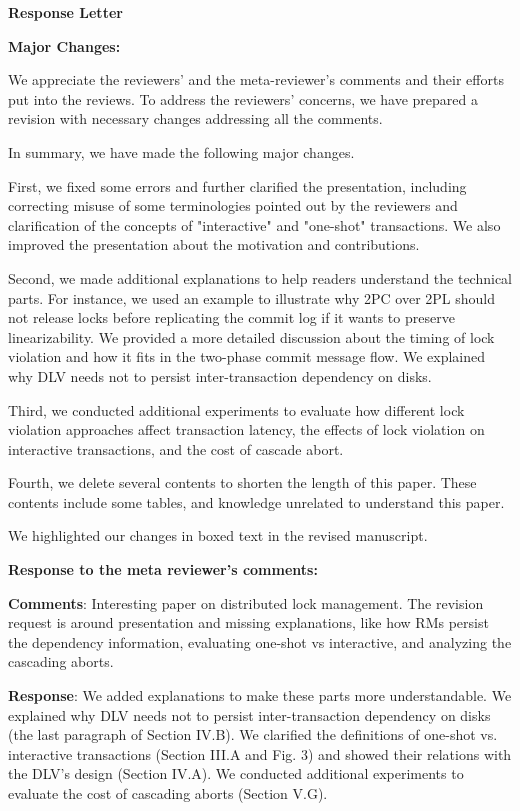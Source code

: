 \documentclass[conference]{IEEEtran}
\begin{document}
\begin{frame}{\relax}%

  \textbf{Response Letter}  


 \textbf{Major Changes:} 

  We appreciate the reviewers' and the meta-reviewer's comments and their efforts put into the reviews. To address the reviewers' concerns, we have prepared a revision with necessary changes addressing all the comments. 
  
  In summary, we have made the following major changes.
  
  First, we fixed some errors and further clarified the presentation, including correcting misuse of some terminologies pointed out by the reviewers and clarification of the concepts of "interactive" and "one-shot" transactions. We also improved the presentation about the motivation and contributions.
  
  Second, we made additional explanations to help readers understand the technical parts. For instance, we used an example to illustrate why 2PC over 2PL should not release locks before replicating the commit log if it wants to preserve linearizability. We provided a more detailed discussion about the timing of lock violation and how it fits in the two-phase commit message flow. We explained why DLV needs not to persist inter-transaction dependency on disks.
  
  Third, we conducted additional experiments to evaluate how different lock violation approaches affect transaction latency, the effects of lock violation on interactive transactions, and the cost of cascade abort.
  
  Fourth, we delete several contents to shorten the length of this paper. These contents include some tables, and knowledge unrelated to understand this paper.
  
  \begin{highlighted}
    We highlighted our changes  in boxed text in the revised manuscript.
  \end{highlighted}

 \textbf{Response to the meta reviewer’s comments:}

  \textbf{Comments}: Interesting paper on distributed lock management. The revision request is around presentation and missing explanations, like how RMs persist the dependency information, evaluating one-shot vs interactive, and analyzing the cascading aborts.
  
  \textbf{Response}: We added explanations to make these parts more understandable. We explained why DLV needs not to persist inter-transaction dependency on disks (the last paragraph of Section IV.B). We clarified the definitions of one-shot vs. interactive transactions (Section III.A and Fig. 3) and showed their relations with the DLV's design (Section IV.A).  We conducted additional experiments to evaluate the cost of cascading aborts (Section V.G).
  


\end{frame}
\end{document}
